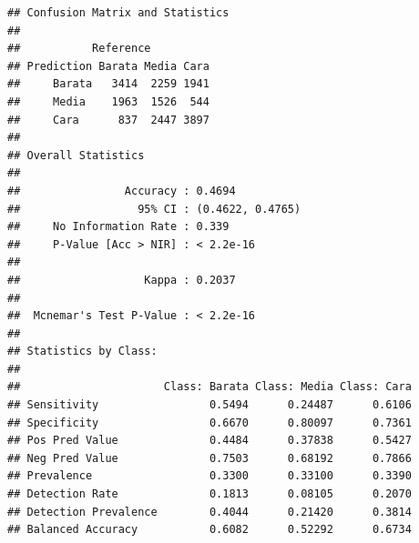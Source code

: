 \documentclass[
]{article}
\newenvironment{Shaded}{\begin{snugshade}}{\end{snugshade}}
\newcommand{\AttributeTok}[1]{\textcolor[rgb]{0.13,0.29,0.53}{#1}}
\newcommand{\ConstantTok}[1]{\textcolor[rgb]{0.56,0.35,0.01}{#1}}
\newcommand{\DecValTok}[1]{\textcolor[rgb]{0.00,0.00,0.81}{#1}}
\newcommand{\FloatTok}[1]{\textcolor[rgb]{0.00,0.00,0.81}{#1}}
\newcommand{\FunctionTok}[1]{\textcolor[rgb]{0.13,0.29,0.53}{\textbf{#1}}}
\newcommand{\NormalTok}[1]{#1}
\newcommand{\OtherTok}[1]{\textcolor[rgb]{0.56,0.35,0.01}{#1}}
\newcommand{\SpecialCharTok}[1]{\textcolor[rgb]{0.81,0.36,0.00}{\textbf{#1}}}
\newcommand{\StringTok}[1]{\textcolor[rgb]{0.31,0.60,0.02}{#1}}
\begin{document}
\begin{Shaded}
\end{Shaded}

\begin{verbatim}
## Confusion Matrix and Statistics
## 
##           Reference
## Prediction Barata Media Cara
##     Barata   3414  2259 1941
##     Media    1963  1526  544
##     Cara      837  2447 3897
## 
## Overall Statistics
##                                           
##                Accuracy : 0.4694          
##                  95% CI : (0.4622, 0.4765)
##     No Information Rate : 0.339           
##     P-Value [Acc > NIR] : < 2.2e-16       
##                                           
##                   Kappa : 0.2037          
##                                           
##  Mcnemar's Test P-Value : < 2.2e-16       
## 
## Statistics by Class:
## 
##                      Class: Barata Class: Media Class: Cara
## Sensitivity                 0.5494      0.24487      0.6106
## Specificity                 0.6670      0.80097      0.7361
## Pos Pred Value              0.4484      0.37838      0.5427
## Neg Pred Value              0.7503      0.68192      0.7866
## Prevalence                  0.3300      0.33100      0.3390
## Detection Rate              0.1813      0.08105      0.2070
## Detection Prevalence        0.4044      0.21420      0.3814
## Balanced Accuracy           0.6082      0.52292      0.6734
\end{verbatim}
\end{document}
